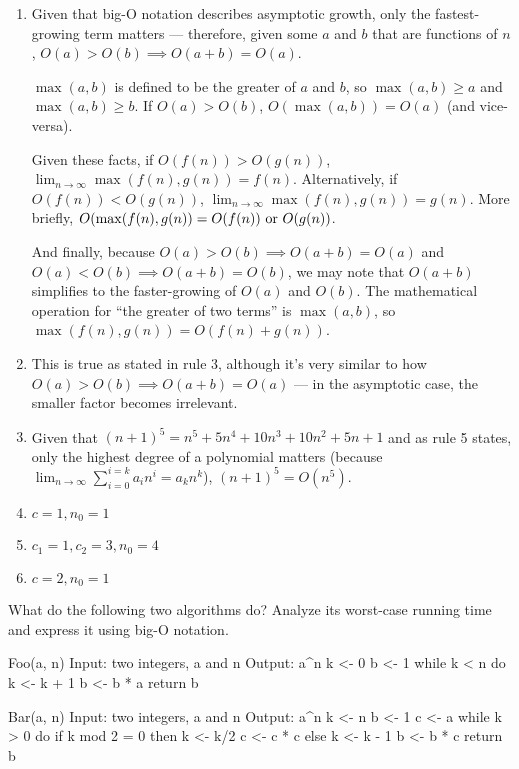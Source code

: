\documentclass[gantt]{brandeis-problemset}
\begin{document}
\begin{enumerate}

\item Given that big-O notation describes asymptotic
growth, only the fastest-growing term matters --- therefore, given some $a$
and $b$ that are functions of $n$, $O(a) > O(b) \implies O(a + b) = O(a)$.

$\max(a, b)$ is defined to be the greater of $a$ and $b$, so $\max(a, b) \ge
a$ and $\max(a, b) \ge b$. If $O(a) > O(b)$, $O(\max(a, b)) = O(a)$ (and
vice-versa).

Given these facts, if $O(f(n)) > O(g(n))$, $\lim_{n\to\infty} \max(f(n),
g(n)) = f(n)$. Alternatively, if $O(f(n)) < O(g(n))$, $\lim_{n\to\infty}
\max(f(n), g(n)) = g(n)$. More briefly, $O(\max(f(n), g(n)) = O(f(n))
\textrm{ or } O(g(n))$.

And finally, because $O(a) > O(b) \implies O(a + b) = O(a)$ and $O(a) < O(b)
\implies O(a + b) = O(b)$, we may note that $O(a + b)$ simplifies to the
faster-growing of $O(a)$ and $O(b)$. The mathematical operation for ``the
greater of two terms'' is $\max(a, b)$, so $\max(f(n), g(n)) = O(f(n) +
g(n))$.

\item This is true as stated in rule 3, although it's very similar to how $O(a) >
O(b) \implies O(a + b) = O(a)$ --- in the asymptotic case, the smaller
factor becomes irrelevant.

\item Given that $(n + 1)^5 = n^5 + 5n^4 + 10n^3 + 10n^2 + 5n +1$ and as rule 5
states, only the highest degree of a polynomial matters (because
$\lim_{n\to\infty} \sum_{i = 0}^{i = k} a_i n^i = a_k n^k$), $(n + 1)^5 =
O(n^5)$.

\item $c = 1, n_0 = 1$

\item $c_1 = 1, c_2 = 3, n_0 = 4$

\item $c = 2, n_0 = 1$

\end{enumerate}

\begin{problem}
	What do the following two algorithms do? Analyze its worst-case
	running time and express it using big-O notation.

\begin{pseudocode}[Foo]
Foo(a, n)
	Input:  two integers, a and n
	Output: a^n
	k <- 0
	b <- 1
	while k < n do
		k <- k + 1
		b <- b * a
	return b
\end{pseudocode}

\begin{pseudocode}[Bar]
Bar(a, n)
	Input:  two integers, a and n
	Output: a^n
	k <- n
	b <- 1
	c <- a
	while k > 0 do
		if k mod 2 = 0 then
			k <- k/2
			c <- c * c
		else
			k <- k - 1
			b <- b * c
	return b
\end{pseudocode}

\end{problem}
\end{document}
